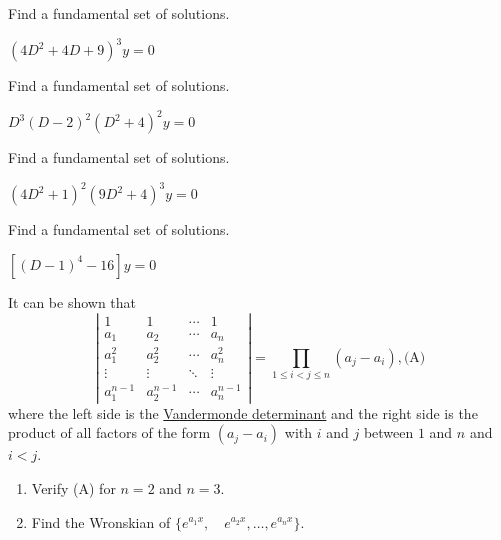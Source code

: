 \documentclass{ximera}
\begin{document}
\begin{problem}\label{exer:9.2.35}  Find a
fundamental set of solutions.

$(4D^2+4D+9)^3y=0$
\end{problem}

\begin{problem}\label{exer:9.2.36} Find a
fundamental set of solutions.

$D^3(D-2)^2(D^2+4)^2y=0$
\end{problem}

\begin{problem}\label{exer:9.2.37}  Find a
fundamental set of solutions.

$(4D^2+1)^2(9D^2+4)^3y=0$
\end{problem}

\begin{problem}\label{exer:9.2.38} Find a
fundamental set of solutions.

$\left[(D-1)^4-16\right]y=0$
\end{problem}


\begin{problem}\label{exer:9.2.39}
It can be shown that
$$
\left|\begin{array}{cccc}
1&1&\cdots&1\\
a_1&a_2&\cdots&a_n\\
a^2_1&a^2_2&\cdots&a^2_n\\
\vdots&\vdots&\ddots&\vdots\\
a^{n-1}_1&a^{n-1}_2&\cdots&a^{n-1}_n\end{array}\right|=
\prod_{1\le i<j\le n}(a_j-a_i),
\text{(A)}
$$
where the left side is  the
\href{http://www-history.mcs.st-and.ac.uk/Mathematicians/Vandermonde.html}{Vandermonde
  determinant} and
the right side is the product of all factors of the form $(a_j-a_i)$
with $i$ and $j$ between $1$ and $n$ and $i<j$.

\begin{enumerate}
\item %
Verify  (A) for $n=2$ and $n=3$.

\item %
Find the Wronskian of $\{e^{{a_1}x}, \quad  e^{{a_2}x},\dots, e^{{a_n}x}\}$.
\end{enumerate}
\end{problem}
\end{document}
